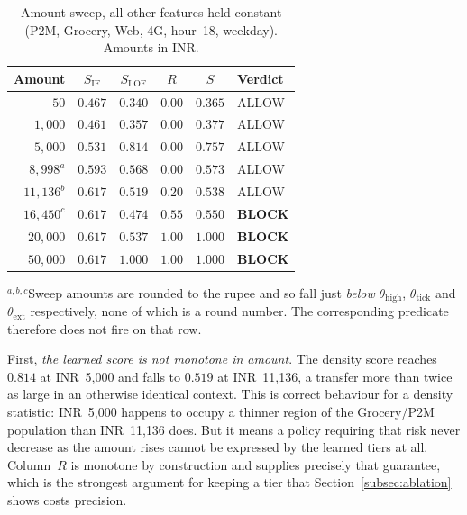 \documentclass[conference]{IEEEtran}
\newcommand{\INR}[1]{\mbox{INR~#1}}
\begin{document}
\begin{table}[t]
\centering
\caption{Amount sweep, all other features held constant (P2M, Grocery,
Web, 4G, hour~18, weekday). Amounts in INR.}
\label{tab:sweep}
\renewcommand{\arraystretch}{1.12}
\footnotesize
\setlength{\tabcolsep}{4pt}
\begin{tabular}{@{}rccccl@{}}
\toprule
\textbf{Amount} & $S_{\mathrm{IF}}$ & $S_{\mathrm{LOF}}$ & $R$ & $S$ & \textbf{Verdict} \\
\midrule
$50$            & $0.467$ & $0.340$ & $0.00$ & $0.365$ & ALLOW \\
$1{,}000$       & $0.461$ & $0.357$ & $0.00$ & $0.377$ & ALLOW \\
$5{,}000$       & $0.531$ & $0.814$ & $0.00$ & $0.757$ & ALLOW \\
$8{,}998^{a}$   & $0.593$ & $0.568$ & $0.00$ & $0.573$ & ALLOW \\
$11{,}136^{b}$  & $0.617$ & $0.519$ & $0.20$ & $0.538$ & ALLOW \\
$16{,}450^{c}$  & $0.617$ & $0.474$ & $0.55$ & $0.550$ & \textbf{BLOCK} \\
$20{,}000$      & $0.617$ & $0.537$ & $1.00$ & $1.000$ & \textbf{BLOCK} \\
$50{,}000$      & $0.617$ & $1.000$ & $1.00$ & $1.000$ & \textbf{BLOCK} \\
\bottomrule
\end{tabular}

\vspace{2pt}
{\footnotesize\raggedright
$^{a,b,c}$Sweep amounts are rounded to the rupee and so fall just
\emph{below} $\theta_{\mathrm{high}}$, $\theta_{\mathrm{tick}}$ and
$\theta_{\mathrm{ext}}$ respectively, none of which is a round number.
The corresponding predicate therefore does not fire on that row.\par}
\end{table}

First, \emph{the learned score is not monotone in amount}. The density
score reaches $0.814$ at \INR{5{,}000} and falls to $0.519$ at
\INR{11{,}136}, a transfer more than twice as large in an otherwise
identical context. This is correct behaviour for a density statistic:
\INR{5{,}000} happens to occupy a thinner region of the Grocery/P2M
population than \INR{11{,}136} does. But it means a policy requiring
that risk never decrease as the amount rises cannot be expressed by the
learned tiers at all. Column~$R$ is monotone by construction and
supplies precisely that guarantee, which is the strongest argument for
keeping a tier that Section~\ref{subsec:ablation} shows costs
precision.
\end{document}
